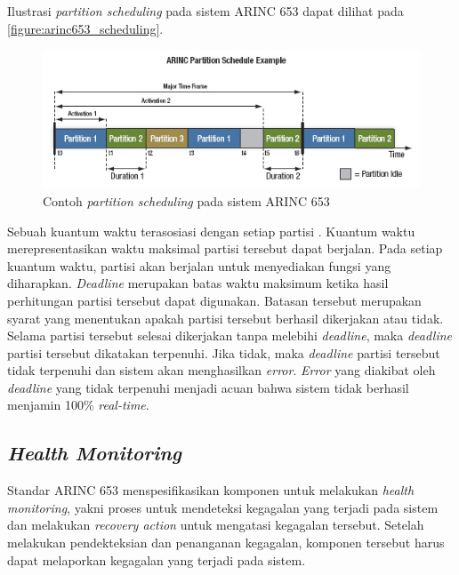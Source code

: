 Ilustrasi \textit{partition scheduling} pada sistem ARINC 653 dapat dilihat pada
\autoref{figure:arinc653_scheduling}.

\begin{figure}[htbp]
    \centering
    \includegraphics[scale=0.8]{resources/arinc653_scheduling.jpg}
    \caption[Contoh \textit{partition scheduling} pada sistem ARINC 653]{Contoh \textit{partition scheduling} pada sistem ARINC 653 \citep{Larry2009}}
    \label{figure:arinc653_scheduling}
\end{figure}

Sebuah kuantum waktu terasosiasi dengan setiap partisi \citep{Larry2009}. Kuantum waktu
merepresentasikan waktu maksimal partisi tersebut dapat berjalan. Pada setiap kuantum waktu,
partisi akan berjalan untuk menyediakan fungsi yang diharapkan. \textit{Deadline} merupakan
batas waktu maksimum ketika hasil perhitungan partisi tersebut dapat digunakan. Batasan tersebut
merupakan syarat yang menentukan apakah partisi tersebut berhasil dikerjakan atau tidak. Selama
partisi tersebut selesai dikerjakan tanpa melebihi \textit{deadline}, maka \textit{deadline}
partisi tersebut dikatakan terpenuhi. Jika tidak, maka \textit{deadline} partisi tersebut tidak
terpenuhi dan sistem akan menghasilkan \textit{error}.  \textit{Error} yang diakibat oleh
\textit{deadline} yang tidak terpenuhi menjadi acuan bahwa sistem tidak berhasil menjamin 100\%
\textit{real-time}.

\subsection{\textit{Health Monitoring}}
\label{section:health_monitoring}

Standar ARINC 653 menspesifikasikan komponen untuk melakukan \textit{health monitoring}, yakni
proses untuk mendeteksi kegagalan yang terjadi pada sistem dan melakukan \textit{recovery
action} untuk mengatasi kegagalan tersebut. Setelah melakukan pendekteksian dan penanganan
kegagalan, komponen tersebut harus dapat melaporkan kegagalan yang terjadi pada sistem.


